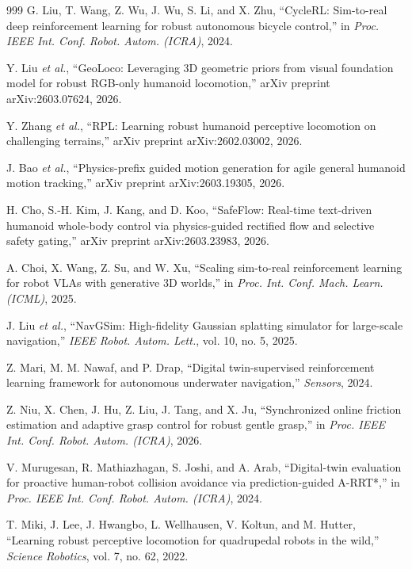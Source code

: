 ﻿\documentclass[11pt,a4paper]{article}
\begin{document}
\begin{thebibliography}{999}
G. Liu, T. Wang, Z. Wu, J. Wu, S. Li, and X. Zhu, ``{CycleRL}: Sim-to-real deep reinforcement learning for robust autonomous bicycle control,'' in \textit{Proc. IEEE Int. Conf. Robot. Autom. (ICRA)}, 2024.

Y. Liu \textit{et al.}, ``{GeoLoco}: Leveraging 3D geometric priors from visual foundation model for robust {RGB}-only humanoid locomotion,'' arXiv preprint arXiv:2603.07624, 2026.

Y. Zhang \textit{et al.}, ``{RPL}: Learning robust humanoid perceptive locomotion on challenging terrains,'' arXiv preprint arXiv:2602.03002, 2026.

J. Bao \textit{et al.}, ``Physics-prefix guided motion generation for agile general humanoid motion tracking,'' arXiv preprint arXiv:2603.19305, 2026.

H. Cho, S.-H. Kim, J. Kang, and D. Koo, ``{SafeFlow}: Real-time text-driven humanoid whole-body control via physics-guided rectified flow and selective safety gating,'' arXiv preprint arXiv:2603.23983, 2026.

A. Choi, X. Wang, Z. Su, and W. Xu, ``Scaling sim-to-real reinforcement learning for robot VLAs with generative 3D worlds,'' in \textit{Proc. Int. Conf. Mach. Learn. (ICML)}, 2025.

J. Liu \textit{et al.}, ``{NavGSim}: High-fidelity Gaussian splatting simulator for large-scale navigation,'' \textit{IEEE Robot. Autom. Lett.}, vol. 10, no. 5, 2025.

Z. Mari, M. M. Nawaf, and P. Drap, ``Digital twin-supervised reinforcement learning framework for autonomous underwater navigation,'' \textit{Sensors}, 2024.

Z. Niu, X. Chen, J. Hu, Z. Liu, J. Tang, and X. Ju, ``Synchronized online friction estimation and adaptive grasp control for robust gentle grasp,'' in \textit{Proc. IEEE Int. Conf. Robot. Autom. (ICRA)}, 2026.

V. Murugesan, R. Mathiazhagan, S. Joshi, and A. Arab, ``Digital-twin evaluation for proactive human-robot collision avoidance via prediction-guided A-RRT*,'' in \textit{Proc. IEEE Int. Conf. Robot. Autom. (ICRA)}, 2024.

T. Miki, J. Lee, J. Hwangbo, L. Wellhausen, V. Koltun, and M. Hutter, ``Learning robust perceptive locomotion for quadrupedal robots in the wild,'' \textit{Science Robotics}, vol. 7, no. 62, 2022.


\end{thebibliography}
\end{document}
